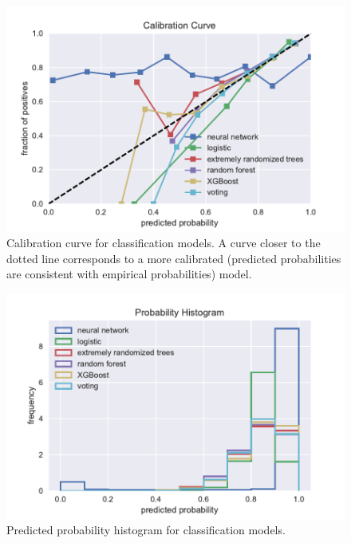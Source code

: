 \documentclass[12pt]{article}
\begin{document}
\begin{figure}[!htbp]
    \centering
    \includegraphics[width=\textwidth]{graphics/calibration_curve}
    \caption{Calibration curve for classification models. A curve closer to the dotted line corresponds to a more calibrated (predicted probabilities are consistent with empirical probabilities) model.}
    \label{fig:calibration}
\end{figure}

\begin{figure}[!htbp]
    \centering
    \includegraphics[width=\textwidth]{graphics/prob_hist}
    \caption{Predicted probability histogram for classification models.}
    \label{fig:prob_hist}
\end{figure}
\end{document}
